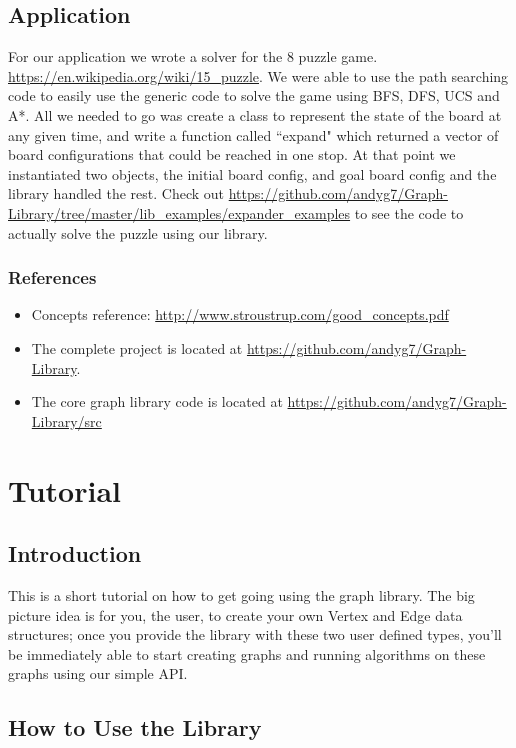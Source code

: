 \documentclass{article}
\begin{document}
\subsection{Application}
For our application we wrote a solver for the 8 puzzle game. \url{https://en.wikipedia.org/wiki/15_puzzle}. We were able to use the path searching code to easily use the generic code to solve the game using BFS, DFS, UCS and A*. All we needed to go was create a class to represent the state of the board at any given time, and write a function called ``expand" which returned a vector of board configurations that could be reached in one stop. At that point we instantiated two objects, the initial board config, and goal board config and the library handled the rest. Check out \url{https://github.com/andyg7/Graph-Library/tree/master/lib_examples/expander_examples} to see the code to actually solve the puzzle using our library.

\subsubsection{References}
\begin{itemize}
\item Concepts reference: \url{http://www.stroustrup.com/good_concepts.pdf}
\item The complete project is located at \url{https://github.com/andyg7/Graph-Library}.
\item The core graph library code is located at \url{https://github.com/andyg7/Graph-Library/src}
\end{itemize}

\section{Tutorial}

\subsection{Introduction}
This is a short tutorial on how to get going using the graph library. The big picture idea is for you, the user, to create your own Vertex and Edge data structures; once you provide the library with these two user defined types, you'll be immediately able to start creating graphs and running algorithms on these graphs using our simple API.

\subsection{How to Use the Library}
\end{document}
